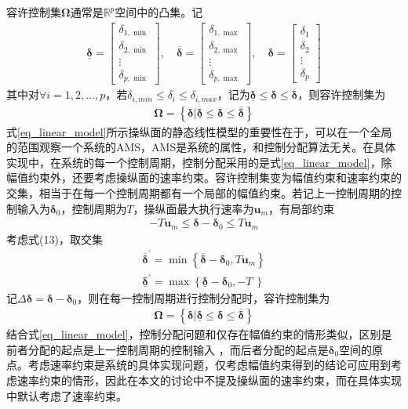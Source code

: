 容许控制集$\bm{\Omega}$通常是$\mathbb{R}^p$空间中的凸集。记
\begin{align}
\underline{\bm{\delta}}=\begin{bmatrix}
\delta_{1, \min } \\
\delta_{2, \min } \\
\vdots \\
\delta_{p, \min }
\end{bmatrix}, \quad \overline{\bm{\delta}}=\begin{bmatrix}
\delta_{1, \max } \\
\delta_{2, \max } \\
\vdots \\
\delta_{p, \max }
\end{bmatrix}, \quad \bm{\delta}=\begin{bmatrix}
\delta_{1} \\
\delta_{2} \\
\vdots \\
\delta_{p}
\end{bmatrix}
\end{align}
其中对$\forall i = 1, 2, \ldots, p$，若$\delta_{i,min} \leq {\delta }_i \leq {\delta}_{i,max}$，记为$\underline{\bm{\delta}} \leq \bm{\delta} \leq \overline{\bm{\delta}}$，则容许控制集为
\begin{align}
\bm{\Omega}=\left\lbrace   \bm{\delta} | \underline{\bm{\delta}} \leq \bm{\delta} \leq \bar{\bm{\delta}}\right\rbrace   \label{eq_effetor_limit}
\end{align}
式\eqref{eq_linear_model}所示操纵面的静态线性模型的重要性在于，可以在一个全局的范围观察一个系统的AMS，AMS是系统的属性，和控制分配算法无关。在具体实现中，在系统的每一个控制周期，控制分配采用的是式\eqref{eq_linear_model}，除幅值约束外，还要考虑操纵面的速率约束。容许控制集变为幅值约束和速率约束的交集，相当于在每一个控制周期都有一个局部的幅值约束\cite{Durham_2017}。若记上一控制周期的控制输入为$\bm{\delta}_0$，控制周期为$T$，操纵面最大执行速率为$\bm{u}_m$，有局部约束
\begin{align}
-T\bm{u}_m \leq \bm{\delta}-\bm{\delta}_0 \leq T\bm{u}_m 
\end{align}
考虑式(13)，取交集
\begin{align}
\overline{\bm{\delta}}^{\prime}=\min \left\lbrace \overline{\bm{\delta}}-\bm{\delta}_0, T\bm{u}_m\right\rbrace  \\
\underline{\bm{\delta}}^{\prime}=\max \left\lbrace \underline{\bm{\delta}}-\bm{\delta}_0,-T\ \right\rbrace
\end{align}
记$\Delta\bm{\delta}  = \bm{\delta}-{\bm{\delta}}_0$，则在每一控制周期进行控制分配时，容许控制集为
\begin{align}
\bm{\Omega}=\left\lbrace  \bm{\delta} | \underline{\bm{\delta}} \leq \bm{\delta} \leq \overline{\bm{\delta}}\right\rbrace \label{eq_effetor_limit_v}
\end{align}
结合式\eqref{eq_linear_model}，控制分配问题和仅存在幅值约束的情形类似，区别是前者分配的起点是上一控制周期的控制输入 ，而后者分配的起点是$\bm{\delta}_0$空间的原点。考虑速率约束是系统的具体实现问题，仅考虑幅值约束得到的结论可应用到考虑速率约束的情形，因此在本文的讨论中不提及操纵面的速率约束，而在具体实现中默认考虑了速率约束。

